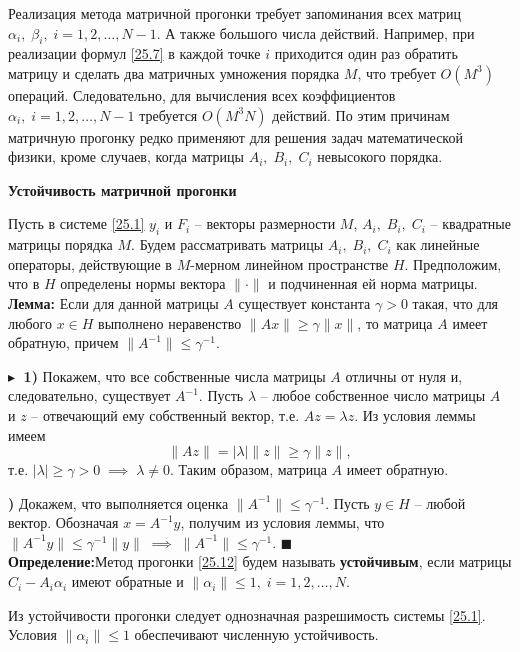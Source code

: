 Реализация метода матричной прогонки требует запоминания всех матриц $\alpha_i, \;\beta_i, \; i = 1,2, \ldots, N-1$. А также большого числа действий. Например, при реализации формул \eqref{25.7} в каждой точке $i$ приходится один раз обратить матрицу и сделать два матричных умножения порядка $M$, что требует $O(M^3)$ операций. Следовательно, для вычисления всех коэффициентов $\alpha_i, \; i = 1, 2, \ldots, N-1$ требуется $O(M^3 N)$ действий. По этим причинам матричную прогонку редко применяют для решения задач математической физики, кроме случаев, когда матрицы $A_i, \; B_i, \; C_i$ невысокого порядка.

\textbf{Устойчивость матричной прогонки}

Пусть в системе \eqref{25.1} $y_i$ и $F_i$ -- векторы размерности $M$, $A_i, \; B_i, \; C_i$ -- квадратные матрицы порядка $M$. Будем рассматривать матрицы $A_i, \; B_i, \; C_i$ как линейные операторы, действующие в $M$-мерном линейном пространстве $H$. Предположим, что в $H$ определены нормы вектора $\|\cdot\|$ и подчиненная ей норма матрицы.\\

\textbf{Лемма:\;} Если для данной матрицы $A$ существует константа $\gamma > 0$ такая, что для любого $x \in H$ выполнено неравенство $\|A x\| \geq \gamma \|x\|$, то матрица $A$ имеет обратную, причем $\|A^{-1}\| \leq \gamma^{-1}$.

$\blacktriangleright\;$ \textbf{1)} Покажем, что все собственные числа матрицы $A$ отличны от нуля и, следовательно, существует $A^{-1}$. Пусть $\lambda$ -- любое собственное число матрицы $A$ и $z$ -- отвечающий ему собственный вектор, т.е. $A z = \lambda z$. Из условия леммы имеем 
$$
\|A z\| = |\lambda| \|z\| \geq \gamma\|z\|,
$$
т.е. $|\lambda| \geq \gamma > 0 \; \implies\; \lambda\ne0$. Таким образом, матрица $A$ имеет обратную.

\textbf{)} Докажем, что выполняется оценка $\|A^{-1}\| \leq \gamma^{-1}$. Пусть $y \in H$ -- любой вектор. Обозначая $x = A^{-1} y$, получим из условия леммы, что $\|A^{-1}y\| \leq \gamma^{-1}\|y\| \; \implies \; \|A^{-1}\| \leq \gamma^{-1}$. \; $\blacksquare$\\

\textbf{Определение:\;}Метод прогонки \eqref{25.12} будем называть \textbf{устойчивым}, если матрицы $C_i - A_i \alpha_i$ имеют обратные и $\|\alpha_i\|\leq 1, \; i = 1, 2, \ldots, N$.

Из устойчивости прогонки следует однозначная разрешимость системы \eqref{25.1}. Условия $\|\alpha_i\|\leq 1$ обеспечивают численную устойчивость.\\

